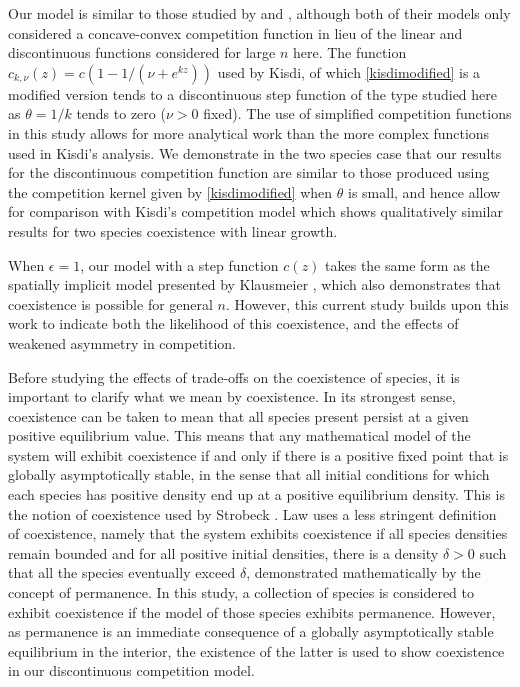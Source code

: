 Our model is similar to those studied by \cite{law1997evolution} and \cite{kisdi1999evolutionary}, although both of their models only considered a concave-convex competition function in lieu of the linear and discontinuous functions considered for large $n$ here. The function $c_{k,\nu}(z) =  c(1-1/(\nu+e^{kz}))$ used by Kisdi, of which \eqref{kisdimodified} is a modified version tends to a discontinuous step function of the type studied here as $\theta = 1/k$ tends to zero ($\nu>0$ fixed). The use of simplified competition functions in this study allows for more analytical work than the more complex functions used in Kisdi's analysis. We demonstrate in the two species case that our results for the discontinuous competition function are similar to those produced using the competition kernel given by \eqref{kisdimodified} when $\theta$ is small, and hence allow for comparison with Kisdi's competition model which shows qualitatively similar results for two species coexistence with linear growth.

When $\epsilon=1$, our model with a step function $c(z)$ takes the same form as the spatially implicit model presented by Klausmeier \cite{klausmeier1998extinction}, which also demonstrates that coexistence is possible for general $n$. However, this current study builds upon this work to indicate both the likelihood of this coexistence, and the effects of weakened asymmetry in competition.

Before studying the effects of trade-offs on the coexistence of species, it is important to clarify what we mean by coexistence. In its strongest sense, coexistence can be taken to mean that all species present persist at a given positive equilibrium value. This means that any mathematical model of the system will exhibit coexistence if and only if there is a positive fixed point that is globally asymptotically stable, in the sense that all initial conditions for which each species has positive density end up at a positive equilibrium density. This is the notion of coexistence used by Strobeck \cite{strobeck1973n}. Law \cite{law1996permanence} uses a less stringent definition of coexistence, namely that the system exhibits coexistence if all species densities remain bounded and for all positive initial densities, there is a  density $\delta>0$ such that all the species eventually exceed $\delta$, demonstrated mathematically by the concept of permanence. In this study, a collection of species is considered to exhibit coexistence if the model of those species exhibits permanence. However, as permanence is an immediate consequence of a globally asymptotically stable equilibrium in the interior, the existence of the latter is used to show coexistence in our discontinuous competition model.

